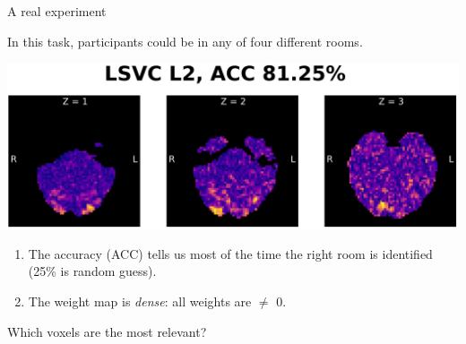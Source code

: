 \documentclass[11pt]{beamer}
\begin{document}
\begin{frame}[squeeze]{A real experiment}

    In this task, participants could be in any of four different rooms.

    \vspace*{-0.9cm}

    \begin{center}
        \includegraphics[scale=0.7]{figures/lsvc_l2-axial.png}
    \end{center}

    \vspace*{-0.2cm}

    \begin{enumerate}
        \item The accuracy (ACC) tells us most of the time the right room is
            identified (25\% is random guess).
        \item The weight map is \emph{dense}: all weights are $\neq$ 0.
    \end{enumerate}

    Which voxels are the most relevant?

\end{frame}
\end{document}
